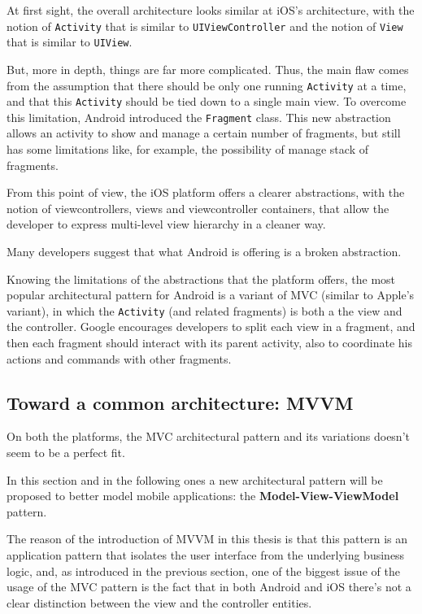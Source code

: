 At first sight, the overall architecture looks similar at iOS's
architecture, with the notion of \texttt{Activity} that is similar to
\texttt{UIViewController} and the notion of \texttt{View} that is
similar to \texttt{UIView}.

But, more in depth, things are far more complicated. Thus, the main flaw
comes from the assumption that there should be only one running
\texttt{Activity} at a time, and that this \texttt{Activity} should be
tied down to a single main view. To overcome this limitation, Android
introduced the \texttt{Fragment} class. This new abstraction allows an
activity to show and manage a certain number of fragments, but still has
some limitations like, for example, the possibility of manage stack of
fragments.

From this point of view, the iOS platform offers a clearer abstractions,
with the notion of viewcontrollers, views and viewcontroller containers,
that allow the developer to express multi-level view hierarchy in a
cleaner way.

Many developers suggest that what Android is offering is a broken
abstraction.

Knowing the limitations of the abstractions that the platform offers,
the most popular architectural pattern for Android is a variant of MVC
(similar to Apple's variant), in which the \texttt{Activity} (and
related fragments) is both a the view and the controller. Google
encourages developers to split each view in a fragment, and then each
fragment should interact with its parent activity, also to coordinate
his actions and commands with other fragments.

\subsection{Toward a common architecture:
MVVM}\label{toward-a-common-architecture-mvvm}

On both the platforms, the MVC architectural pattern and its variations
doesn't seem to be a perfect fit.

In this section and in the following ones a new architectural pattern
will be proposed to better model mobile applications: the
\textbf{Model-View-ViewModel} pattern.

The reason of the introduction of MVVM in this thesis is that this
pattern is an application pattern that isolates the user interface from
the underlying business logic, and, as introduced in the previous
section, one of the biggest issue of the usage of the MVC pattern is the
fact that in both Android and iOS there's not a clear distinction
between the view and the controller entities.

